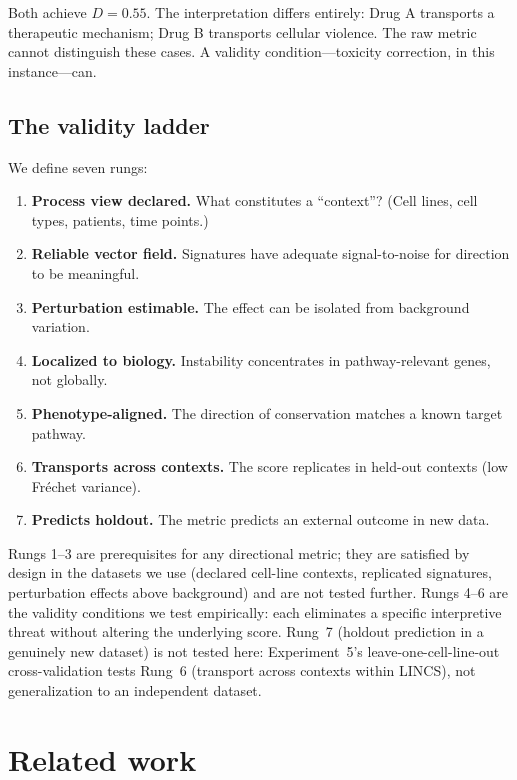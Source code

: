 \documentclass{article}
\begin{document}
Both achieve $D = 0.55$. The interpretation differs entirely: Drug A
transports a therapeutic mechanism; Drug B transports cellular violence. The
raw metric cannot distinguish these cases. A validity condition---toxicity
correction, in this instance---can.

\subsection{The validity ladder}

We define seven rungs:

\begin{enumerate}
  \item \textbf{Process view declared.} What constitutes a ``context''?
    (Cell lines, cell types, patients, time points.)
  \item \textbf{Reliable vector field.} Signatures have adequate signal-to-noise
    for direction to be meaningful.
  \item \textbf{Perturbation estimable.} The effect can be isolated from
    background variation.
  \item \textbf{Localized to biology.} Instability concentrates in
    pathway-relevant genes, not globally.
  \item \textbf{Phenotype-aligned.} The direction of conservation matches a
    known target pathway.
  \item \textbf{Transports across contexts.} The score replicates in held-out
    contexts (low Fr\'echet variance).
  \item \textbf{Predicts holdout.} The metric predicts an external outcome
    in new data.
\end{enumerate}

Rungs 1--3 are prerequisites for any directional metric; they are satisfied
by design in the datasets we use (declared cell-line contexts, replicated
signatures, perturbation effects above background) and are not tested further.
Rungs 4--6 are the validity conditions we test empirically: each eliminates a
specific interpretive threat without altering the underlying score. Rung~7
(holdout prediction in a genuinely new dataset) is not tested here:
Experiment~5's leave-one-cell-line-out cross-validation tests Rung~6
(transport across contexts within LINCS), not generalization to an
independent dataset.

\section{Related work}
\end{document}
